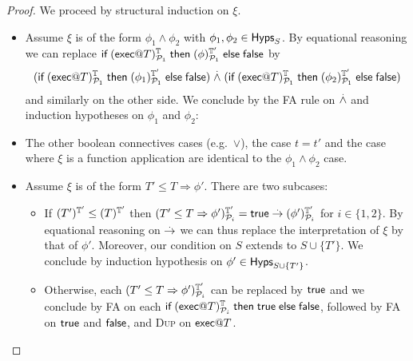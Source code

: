 \begin{proof}
  We proceed by structural induction on $\xi$.
  \begin{itemize}
    \item Assume $\xi$ is of the form $\phi_1\wedge\phi_2$ with
      $\phi_1,\phi_2\in \textsf{Hyps}_S$. By equational reasoning we can replace
      $\textsf{if}\; (\textsf{exec} @ T)^{\mathbb{T}}_{\mathcal{P}_1}
      \;\textsf{then}\; (\phi)^{\mathbb{T}'}_{\mathcal{P}_1} \;\textsf{else}\; \textsf{false}$
      by
      \[
        (\textsf{if}\; (\textsf{exec} @ T)^{\mathbb{T}}_{\mathcal{P}_1}
        \;\textsf{then}\; (\phi_1)^{\mathbb{T}'}_{\mathcal{P}_1} \;\textsf{else}\; \textsf{false})
        \stackrel{.}{\wedge}
        (\textsf{if}\; (\textsf{exec} @ T)^{\mathbb{T}}_{\mathcal{P}_1}
        \;\textsf{then}\; (\phi_2)^{\mathbb{T}'}_{\mathcal{P}_1} \;\textsf{else}\; \textsf{false})
      \]
      and similarly on the other side.
      We conclude by the \textsc{FA} rule on $\stackrel{.}{\wedge}$ and induction
      hypotheses on $\phi_1$ and $\phi_2$:

   \item The other boolean connectives cases (e.g.\ $\vee$), the case $t = t'$ and the case where $\xi$ is a function application are identical to the $\phi_1\wedge\phi_2$ case.
     
   \item Assume $\xi$ is of the form $T' \leq T \Rightarrow \phi'$.
     There are two subcases:
     \begin{itemize}
       \item If $(T')^{\mathbb{T}'}_{} \leq (T)^{\mathbb{T}'}_{}$ then
         $(T' \leq T \Rightarrow \phi')^{\mathbb{T}'}_{\mathcal{P}_i} =
         \textsf{true} \stackrel{.}{\rightarrow} (\phi')^{\mathbb{T}'}_{\mathcal{P}_i}$ for $i\in \{1,2\}$.
         By equational reasoning on $\stackrel{.}{\rightarrow}$ we can thus replace
         the interpretation of $\xi$ by that of $\phi'$.
         Moreover, our condition on $S$ extends to $S \cup \{T'\}$.
         We conclude by induction hypothesis on
         $\phi' \in \textsf{Hyps}_{S\cup\{T'\}}$.
       \item Otherwise, each
         $(T' \leq T \Rightarrow \phi')^{\mathbb{T}'}_{\mathcal{P}_i}$ can be
         replaced by $\textsf{true}$ and we conclude by \textsc{FA}
         on each $\textsf{if}\; (\textsf{exec} @ T)^{\mathbb{T}}_{\mathcal{P}_i} \;\textsf{then}\; \textsf{true}
         \;\textsf{else}\; \textsf{false}$, followed
         by \textsc{FA} on $\textsf{true}$ and $\textsf{false}$,
         and \textsc{Dup} on $\textsf{exec} @ T$.
     \end{itemize}


\end{itemize}
\end{proof}
